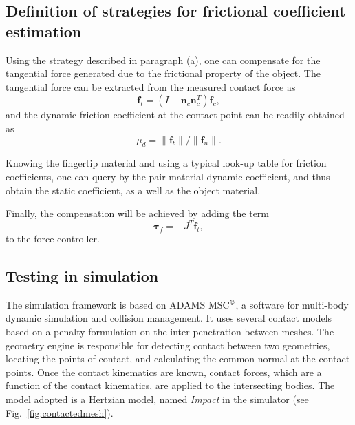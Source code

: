 

\subsection{Definition of strategies for frictional coefficient estimation}
Using the strategy described in paragraph (a), one can compensate for the tangential force generated due to the frictional property of the object. The tangential force can be extracted from the measured contact force as
\begin{equation}
    \mathbf{f}_t = (I-\mathbf{n}_{c}\mathbf{n}^T_{c})\mathbf{f}_c,
\end{equation}
and the dynamic friction coefficient at the contact point can be readily obtained as
\begin{equation}
    \mu_{d} = \lVert{\mathbf{f}_{t}}\rVert/\lVert{\mathbf{f}_{n}}\rVert.
\end{equation}

Knowing the fingertip material and using a typical look-up table for friction coefficients, one can query by the pair material-dynamic coefficient, and thus obtain the static coefficient, as a well as the object material.

Finally, the compensation will be achieved by adding the term
\begin{equation}
    \boldsymbol{\tau}_f=-J^T \mathbf{f}_t,
\end{equation}
to the force controller.

\subsection{Testing in simulation}
The simulation framework is based on ADAMS MSC$^\copyright$, a software for multi-body dynamic simulation and collision management. It uses several contact models based on a penalty formulation on the inter-penetration between meshes. The geometry engine is responsible for detecting contact between two geometries, locating the points of contact, and calculating the common normal at the contact points. Once the contact kinematics are known, contact forces, which are a function of the contact kinematics, are applied to the intersecting bodies. The model adopted is a Hertzian model, named \emph{Impact} in the simulator (see Fig.~\ref{fig:contactedmesh}).

